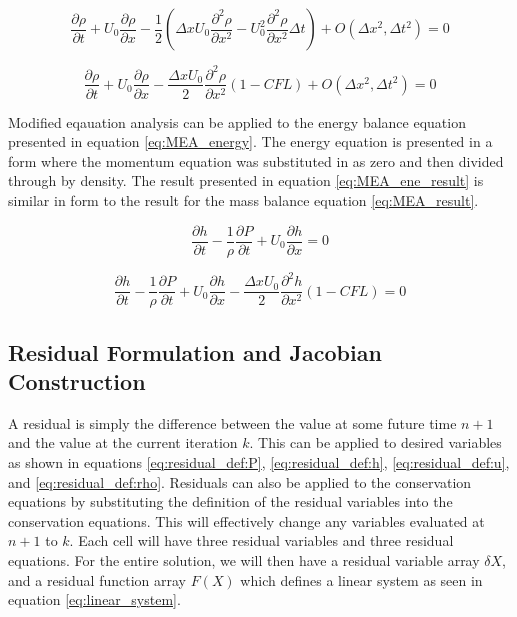 \documentclass{mc2015}
\begin{document}
    \begin{equation}
    	 \frac{\partial \rho}{\partial t}  +  U_{0} \frac{\partial \rho}{\partial x} - 
    	  \frac{1}{2}  \left(  \Delta x U_{0} \frac{\partial^2 \rho}{\partial
    	  x^2} -   U_{0}^2 \frac{\partial^2 \rho}{\partial x^2} \Delta t  \right) 
    	   + O(\Delta x^{2},\Delta t^{2}) = 0
    \end{equation}
    
    \begin{equation}
    \label{eq:MEA_result}
    	 \frac{\partial \rho}{\partial t}  +  U_{0} \frac{\partial \rho}{\partial x} - 
    	 \frac{\Delta x U_{0}}{2} \frac{\partial^2 \rho}{\partial x^2}  
    	 \left(  1 - CFL  \right) 
    	 + O(\Delta x^{2},\Delta t^{2})  = 0
    \end{equation}
    
    Modified eqauation analysis can be applied to the energy balance equation
    presented in equation \ref{eq:MEA_energy}. The energy equation is presented in a form where
    the momentum equation was substituted in as zero and then divided through by
    density. The result presented in equation \ref{eq:MEA_ene_result} is similar in
    form to the result for the mass balance equation \ref{eq:MEA_result}.
    
    \begin{equation}
    	\label{eq:MEA_energy}
    	\frac{\partial h}{\partial t} - \frac{1}{\rho} \frac{\partial P}{\partial t} +
    	U_{0} \frac{\partial h}{\partial x} = 0
    \end{equation}
    
    \begin{equation}
    \label{eq:MEA_ene_result}
    	\frac{\partial h}{\partial t} - \frac{1}{\rho} \frac{\partial P}{\partial t} +
    	U_{0} \frac{\partial h}{\partial x} - 
    	\frac{\Delta x U_{0}}{2} \frac{\partial^2 h}{\partial x^2}
    	\left( 1 - CFL \right)
    	= 0
    \end{equation}

\subsection{Residual Formulation and Jacobian Construction}

	A residual is simply the difference between the value at some future time
    $n+1$ and the value at the current iteration $k$. This can be applied to
    desired variables as shown in equations
    \eqref{eq:residual_def:P}, \eqref{eq:residual_def:h},
    \eqref{eq:residual_def:u}, and \eqref{eq:residual_def:rho}. Residuals can
    also be applied to the conservation equations by substituting the definition
    of the residual variables into the conservation equations. This will
    effectively change any variables evaluated at $n+1$ to $k$. Each cell will
    have three residual variables and three residual equations. For the entire
    solution, we will then have a residual variable array $\delta X$, and a
    residual function array $F(X)$ which defines a linear system as seen in 
    equation \eqref{eq:linear_system}.
        
\end{document}
